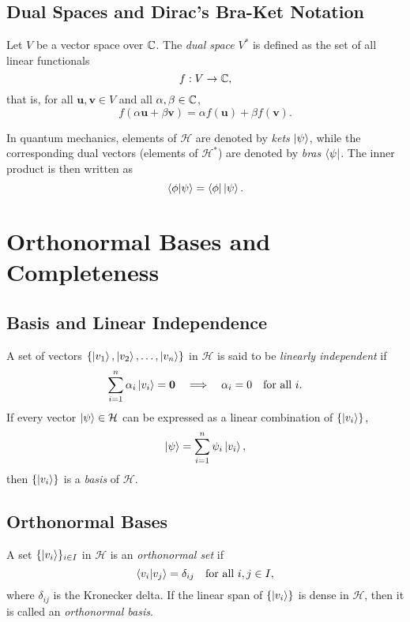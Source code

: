 	\section{Dual Spaces and Dirac’s Bra-Ket Notation}
	\begin{definition}
		Let \( V \) be a vector space over \( \mathbb{C} \). The \emph{dual space} \( V^* \) is defined as the set of all linear functionals 
		\[
		f: V \to \mathbb{C},
		\]
		that is, for all \(\mathbf{u}, \mathbf{v} \in V\) and all \(\alpha, \beta \in \mathbb{C}\),
		\[
		f(\alpha \mathbf{u} + \beta \mathbf{v}) = \alpha f(\mathbf{u}) + \beta f(\mathbf{v}).
		\]
	\end{definition}
	
	In quantum mechanics, elements of \( \mathcal{H} \) are denoted by \emph{kets} \( \left| \psi \right\rangle \), while the corresponding dual vectors (elements of \( \mathcal{H}^* \)) are denoted by \emph{bras} \( \left\langle \psi \right| \). The inner product is then written as
	\[
	\left\langle \phi \middle| \psi \right\rangle = \left\langle \phi \right|\left| \psi \right\rangle.
	\]
	
	\chapter{Orthonormal Bases and Completeness}
	
	\section{Basis and Linear Independence}
	A set of vectors \(\{\left| v_1 \right\rangle, \left| v_2 \right\rangle, \dots, \left| v_n \right\rangle\}\) in \(\mathcal{H}\) is said to be \emph{linearly independent} if
	\[
	\sum_{i=1}^{n} \alpha_i \left| v_i \right\rangle = \mathbf{0} \quad \Longrightarrow \quad \alpha_i = 0 \quad \text{for all } i.
	\]
	If every vector \(\left| \psi \right\rangle \in \mathcal{H}\) can be expressed as a linear combination of \(\{\left| v_i \right\rangle\}\),
	\[
	\left| \psi \right\rangle = \sum_{i=1}^{n} \psi_i \left| v_i \right\rangle,
	\]
	then \(\{\left| v_i \right\rangle\}\) is a \emph{basis} of \(\mathcal{H}\).
	
	\section{Orthonormal Bases}
	\begin{definition}
		A set \(\{\left| v_i \right\rangle\}_{i\in I}\) in \(\mathcal{H}\) is an \emph{orthonormal set} if
		\[
		\left\langle v_i \middle| v_j \right\rangle = \delta_{ij} \quad \text{for all } i,j \in I,
		\]
		where \(\delta_{ij}\) is the Kronecker delta. If the linear span of \(\{\left| v_i \right\rangle\}\) is dense in \(\mathcal{H}\), then it is called an \emph{orthonormal basis}.
	\end{definition}
	
